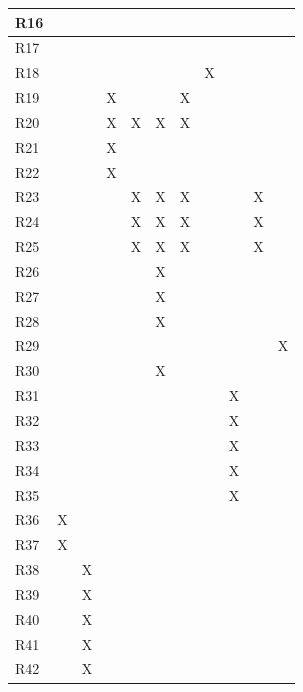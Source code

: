 \documentclass{article}
\begin{document}
\begin{longtable}[c]{|m{0.10cm}|m{0.10cm}|m{0.10cm}|m{0.10cm}|m{0.05cm}|m{0.10cm}|m{0.10cm}|m{0.10cm}|m{0.10cm}|m{0.10cm}|m{0.10cm}|}
 \hline
 R16 &   &  &   &   &   &   &   &   &  &    \\
 \hline
 R17 &   &   &  &   &  &   &   &   &   &   \\
 \hline
 R18 &   &   &  &   &   &   &  X &   &  &    \\
 \hline
 R19 &   &   &  X &  &   & X  &   &   &  &    \\
 \hline
 R20 &   &   &  X & X & X & X  &   &   &  &   \\
 \hline
 R21 &   &   & X  &  &   &   &   &   &  &   \\
 \hline
 R22 &   &   & X  &   &   &   &  &   &  &   \\
 \hline
 R23 &   &   &   & X  & X  & X  &   &   & X &    \\
 \hline
 R24 &   &   &   & X  & X  &  X &   &   & X  &  \\
 \hline
 R25 &   &   &   &  X & X  & X  &   &   & X &    \\
 \hline
 R26 &   &   &   &   & X &   &   &   &  &    \\
 \hline
 R27 &   &   &   &   & X &   &   &   &  &    \\
 \hline
 R28 &   &   &   &   & X  &  &   &   &  &    \\
 \hline
 R29 &   &   &   &   &   &  &   &   & & X \\
 \hline
 R30 &   &   &   &   & X  &  &   &   &   &   \\
 \hline
 R31 &   &   &   &   &   &  &   & X  &   &   \\
 \hline
 R32 &   &   &   &   &   &  &   & X  &  &    \\
 \hline
 R33 &   &   &   &   &   &  &   & X  &  &    \\
 \hline
 R34 &   &   &   &   &   &   &   & X &   &   \\
 \hline
 R35 &   &   &   &   &   &   &   & X &  &    \\
 \hline
 R36 & X  &   &   &   &   &   &   &  &  &    \\
 \hline
 R37 & X  &   &   &   &   &   &   &  & &     \\
 \hline
 R38 &   & X  &   &   &   &   &  &   & &    \\
 \hline
 R39 &   & X  &   &   &   &   &  &   &  &   \\
 \hline
 R40 &   & X  &   &   &   &   &  &   &  &   \\
 \hline
 R41 &   & X  &   &   &   &   &  &   &  &    \\
 \hline
 R42 &   & X  &   &   &   &   &  &   &  &    \\
 \hline

\end{longtable}
\end{document}
